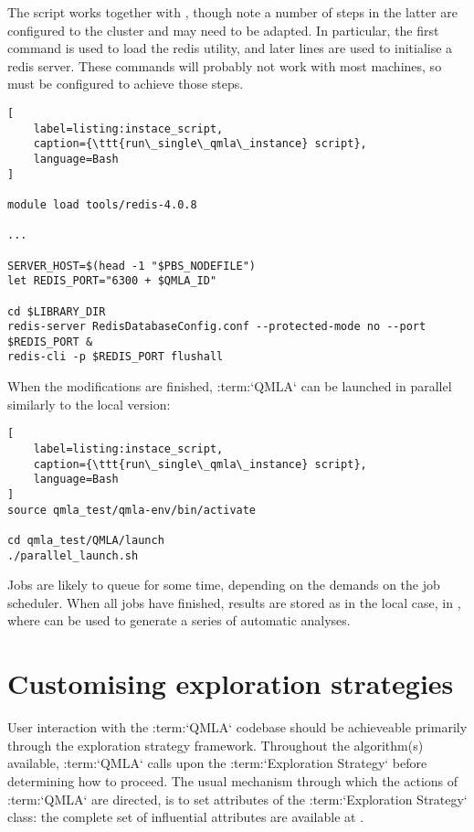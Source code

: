 \par 

The  script works together with , 
    though note a number of steps in the latter are configured to the cluster and may need to be adapted. 
In particular, the first command is used to load the redis utility, and later lines are used to initialise a 
redis server. 
These commands will probably not work with most machines, so must be configured to achieve those steps. 


\begin{lstlisting}[
    label=listing:instace_script,
    caption={\ttt{run\_single\_qmla\_instance} script},
    language=Bash
]

module load tools/redis-4.0.8

... 

SERVER_HOST=$(head -1 "$PBS_NODEFILE")
let REDIS_PORT="6300 + $QMLA_ID"

cd $LIBRARY_DIR
redis-server RedisDatabaseConfig.conf --protected-mode no --port $REDIS_PORT & 
redis-cli -p $REDIS_PORT flushall

\end{lstlisting}

When the modifications are finished, 
    :term:`QMLA` can be launched in parallel similarly to the local version: 

\begin{lstlisting}[
    label=listing:instace_script,
    caption={\ttt{run\_single\_qmla\_instance} script},
    language=Bash
]
source qmla_test/qmla-env/bin/activate

cd qmla_test/QMLA/launch
./parallel_launch.sh

\end{lstlisting}
\par 

Jobs are likely to queue for some time, depending on the demands on the job scheduler. 
When all jobs have finished, results are stored as in the local case, 
    in ,
    where  can be used to generate a series of automatic analyses. 
\par 

\section{Customising exploration strategies}
User interaction with the :term:`QMLA` codebase should be achieveable primarily through the exploration strategy framework. 
Throughout the algorithm(s) available, :term:`QMLA` calls upon the :term:`Exploration Strategy` before determining how to proceed. 
The usual mechanism through which the actions of :term:`QMLA` are directed, 
    is to set attributes of the :term:`Exploration Strategy` class:
    the complete set of influential attributes are available at \cite{qmla_docs}. 

